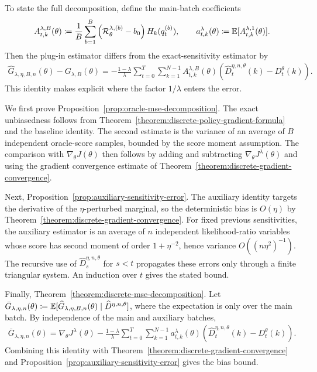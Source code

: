 To state the full decomposition, define the main-batch coefficients
\begin{align}
    A_{t,k}^{\lambda,B}(\theta)
    \coloneqq
    \frac1B\sum_{b=1}^B
    \left({\cal R}_\theta^{\lambda,(b)}-b_0\right)
    H_k(q_t^{(b)}),
    \qquad
    a_{t,k}^{\lambda}(\theta)
    \coloneqq
    \mathbb{E}[A_{t,k}^{\lambda,1}(\theta)].
\end{align}
Then the plug-in estimator differs from the exact-sensitivity estimator by
\begin{align}
    \widehat G_{\lambda,\eta,B,n}(\theta)-G_{\lambda,B}(\theta)
    =
    -\frac{1-\lambda}{\lambda}
    \sum_{t=0}^T\sum_{k=1}^{N-1}
    A_{t,k}^{\lambda,B}(\theta)
    \left(
        \widehat D_t^{\eta,n,\theta}(k)-D_t^\theta(k)
    \right).
\end{align}
This identity makes explicit where the factor $1/\lambda$ enters the error.
\label{appendix:discrete-mse-proofs}

We first prove Proposition~\ref{prop:oracle-mse-decomposition}.
The exact unbiasedness follows from Theorem~\ref{theorem:discrete-policy-gradient-formula} and the baseline identity. The second estimate is the variance of an average of $B$ independent oracle-score samples, bounded by the score moment assumption. The comparison with $\nabla_\theta J(\theta)$ then follows by adding and subtracting $\nabla_\theta J^\lambda(\theta)$ and using the gradient convergence estimate of Theorem~\ref{theorem:discrete-gradient-convergence}.

Next, Proposition~\ref{prop:auxiliary-sensitivity-error}.
The auxiliary identity targets the derivative of the $\eta$-perturbed marginal, so the deterministic bias is $O(\eta)$ by Theorem~\ref{theorem:discrete-gradient-convergence}. For fixed previous sensitivities, the auxiliary estimator is an average of $n$ independent likelihood-ratio variables whose score has second moment of order $1+\eta^{-2}$, hence variance $O((n\eta^2)^{-1})$. The recursive use of $\widehat D_s^{\eta,n,\theta}$ for $s<t$ propagates these errors only through a finite triangular system. An induction over $t$ gives the stated bound.

Finally, Theorem~\ref{theorem:discrete-mse-decomposition}.
Let $\bar G_{\lambda,\eta,n}(\theta)\coloneqq\mathbb{E}[\widehat G_{\lambda,\eta,B,n}(\theta)\mid \widehat D^{\eta,n,\theta}]$, where the expectation is only over the main batch. By independence of the main and auxiliary batches,
\begin{align}
    \bar G_{\lambda,\eta,n}(\theta)
    =
    \nabla_\theta J^\lambda(\theta)
    -
    \frac{1-\lambda}{\lambda}
    \sum_{t=0}^T\sum_{k=1}^{N-1}
    a_{t,k}^{\lambda}(\theta)
    \left(
        \widehat D_t^{\eta,n,\theta}(k)-D_t^\theta(k)
    \right).
\end{align}
Combining this identity with Theorem~\ref{theorem:discrete-gradient-convergence} and Proposition~\ref{prop:auxiliary-sensitivity-error} gives the bias bound.

